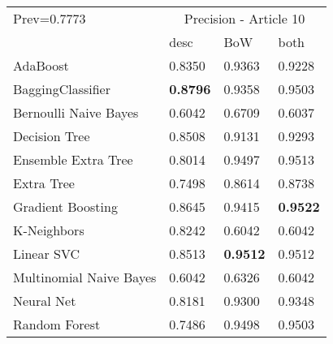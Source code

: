 \begin{tabular}{|l|l|l|l| }
\hline
Prev=0.7773 &  \multicolumn{3}{c|}{Precision - Article 10} \\
\cline{2-4} & desc & BoW & both \\ \hline
AdaBoost                & 0.8350 & 0.9363 & 0.9228\\
BaggingClassifier       & {\bf 0.8796} & 0.9358 & 0.9503\\
Bernoulli Naive Bayes   & 0.6042 & 0.6709 & 0.6037\\
Decision Tree           & 0.8508 & 0.9131 & 0.9293\\
Ensemble Extra Tree     & 0.8014 & 0.9497 & 0.9513\\
Extra Tree              & 0.7498 & 0.8614 & 0.8738\\
Gradient Boosting       & 0.8645 & 0.9415 & {\bf 0.9522}\\
K-Neighbors             & 0.8242 & 0.6042 & 0.6042\\
Linear SVC              & 0.8513 & {\bf 0.9512} & 0.9512\\
Multinomial Naive Bayes & 0.6042 & 0.6326 & 0.6042\\
Neural Net              & 0.8181 & 0.9300 & 0.9348\\
Random Forest           & 0.7486 & 0.9498 & 0.9503\\
\hline
\end{tabular}